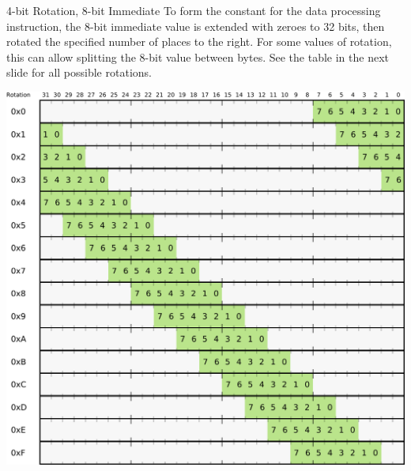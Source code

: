 \documentclass[aspectratio=169]{beamer}
\begin{document}
\begin{frame}{4-bit Rotation, 8-bit Immediate}
    To form the constant for the data processing instruction, the 8-bit immediate value is extended with zeroes to 32 bits, then rotated the specified number of places to the right. For some values of rotation, this can allow splitting the 8-bit value between bytes. See the table in the next slide for all possible rotations.

\end{frame}

\begin{frame}{}

    \begin{center}
        \includegraphics[width=0.62\linewidth]{../figures/possiblerotations.pdf}
    \end{center}
    
\end{frame}
\end{document}
